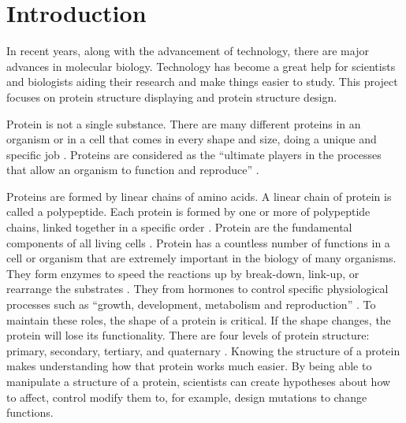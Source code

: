 \chapter{Introduction}
\label{ch:intro}

In recent years, along with the advancement of technology, there are major advances in molecular biology. Technology has become a great help for scientists and biologists aiding their research and make things easier to study. This project focuses on protein structure displaying and protein structure design.

Protein is not a single substance. There are many different proteins in an organism or in a cell that comes in every shape and size, doing a unique and specific job \parencite{noauthor_introduction_nodate}. Proteins are considered as the ``ultimate players in the processes that allow an organism to function and reproduce'' \parencite{stephenson_protein_2016}.

Proteins are formed by linear chains of amino acids. A linear chain of protein is called a polypeptide. Each protein is formed by one or more of polypeptide chains, linked together in a specific order \parencite{noauthor_introduction_nodate}. Protein are the fundamental components of all living cells \parencite{hutchison_protein_2013}. Protein has a countless number of functions in a cell or organism that are extremely important in the biology of many organisms. They form enzymes to speed the reactions up by break-down, link-up, or rearrange the substrates \parencite{noauthor_introduction_nodate}. They from hormones to control specific physiological processes such as ``growth, development, metabolism and reproduction'' \parencite{noauthor_introduction_nodate}. To maintain these roles, the shape of a protein is critical. If the shape changes, the protein will lose its functionality. There are four levels of protein structure: primary, secondary, tertiary, and quaternary \parencite{noauthor_introduction_nodate}.
Knowing the structure of a protein makes understanding how that protein works much easier. By being able to manipulate a structure of a protein, scientists can create hypotheses about how to affect, control modify them to, for example, design mutations to change functions. 

